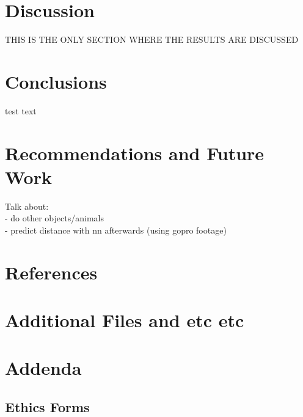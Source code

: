 \documentclass{article}
\begin{document}
\section{Discussion}
THIS IS THE ONLY SECTION WHERE THE RESULTS ARE DISCUSSED

\section{Conclusions}
test text

\section{Recommendations and Future Work}
Talk about: \\
- do other objects/animals \\
- predict distance with nn afterwards (using gopro footage)

\section{References}

\appendix
\section{Additional Files and etc etc}

\section{Addenda}
\subsection{Ethics Forms}

\end{document}

